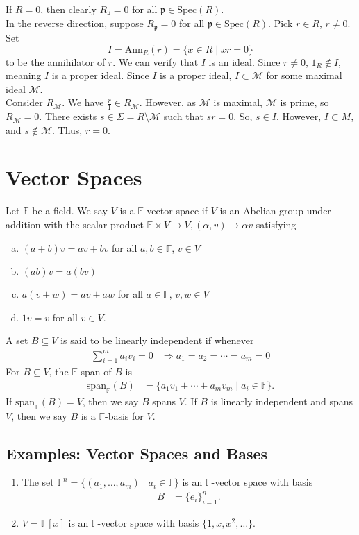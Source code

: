 \documentclass[10pt]{extarticle}
\begin{document}
  If $R = 0$, then clearly $R_{\mathfrak{p}} = 0$ for all $\mathfrak{p}\in \text{Spec}(R)$.\\

  In the reverse direction, suppose $R_\mathfrak{p} = 0$ for all $\mathfrak{p}\in \text{Spec}(R)$. Pick $r\in R$, $r\neq 0$. Set $$I = \text{Ann}_{R}(r) = \{x\in R\mid xr = 0\}$$ to be the annihilator of $r$. We can verify that $I$ is an ideal. Since $r\neq 0$, $1_R\notin I$, meaning $I$ is a proper ideal. Since $I$ is a proper ideal, $I\subset \mathcal{M}$ for some maximal ideal $\mathcal{M}$.\\

  Consider $R_{\mathcal{M}}$. We have $\frac{r}{1}\in R_{\mathcal{M}}$. However, as $\mathcal{M}$ is maximal, $\mathcal{M}$ is prime, so $R_{\mathcal{M}} = 0$. There exists $s\in \Sigma = R\setminus\mathcal{M}$ such that $sr = 0$. So, $s\in I$. However, $I\subset M$, and $s\notin \mathcal{M}$. Thus, $r = 0$.
  \section{Vector Spaces}%
  Let $\mathbb{F}$ be a field. We say $V$ is a $\mathbb{F}$-vector space if $V$ is an Abelian group under addition with the scalar product $\mathbb{F}\times V \rightarrow V,(\alpha,v)\rightarrow \alpha v$ satisfying
  \begin{enumerate}[(a)]
    \item $(a + b)v = av + bv$ for all $a,b\in \mathbb{F}$, $v\in V$
    \item $(ab)v = a(bv)$
    \item $a(v+w) = av + aw$ for all $a\in \mathbb{F}$, $v,w\in V$
    \item $1v = v$ for all $v\in V$.
  \end{enumerate}
  A set $B\subseteq V$ is said to be linearly independent if whenever 
  \begin{align*}
    \sum_{i=1}^{m}a_iv_i = 0 &\Rightarrow a_1 = a_2 = \cdots = a_m = 0
  \end{align*}
  For $B\subseteq V$, the $\mathbb{F}$-span of $B$ is
  \begin{align*}
    \text{span}_{\mathbb{F}}(B) &= \{a_1v_1 + \cdots + a_mv_m\mid a_i\in \mathbb{F}\}.
  \end{align*}
  If $\text{span}_{\mathbb{F}}(B) = V$, then we say $B$ spans $V$. If $B$ is linearly independent and spans $V$, then we say $B$ is a $\mathbb{F}$-basis for $V$.
  \subsection{Examples: Vector Spaces and Bases}%
  \begin{enumerate}[(1)]
    \item The set $\mathbb{F}^{n} = \{(a_1,\dots,a_m)\mid a_i\in \mathbb{F}\}$ is an $\mathbb{F}$-vector space with basis
      \begin{align*}
        B &= \{e_i\}_{i=1}^{n}.
      \end{align*}
    \item $V = \mathbb{F}[x]$ is an $\mathbb{F}$-vector space with basis $\{1,x,x^2,\dots\}$.
  \end{enumerate}
\end{document}
